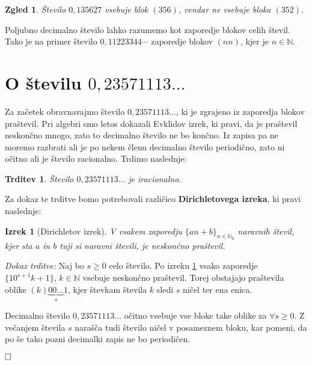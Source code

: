 \documentclass[a4paper,12pt]{article}
\def\N{\mathbb{N}} %
\def\qed{$\hfill\Box$}   %
\newtheorem{izrek}{Izrek}
\newtheorem{trditev}{Trditev}
\newtheorem{zgled}{Zgled}
\begin{document}
\begin{zgled}
    Število $0,135627$ vsebuje blok $(356)$, vendar ne vsebuje bloka $(352)$.
\end{zgled}

Poljubno decimalno število lahko razumemo kot zaporedje blokov celih števil.
Tako je na primer število $0,11223344 \cdots$ zaporedje blokov $(nn)$,
kjer je $n \in \N$.


\section{O številu $0,23571113 \dots$}

Za začetek obravnavajmo število $0,23571113 \dots$, ki je zgrajeno iz zaporedja
blokov praštevil. 
Pri algebri smo letos dokazali Evklidov izrek, ki pravi, da je praštevil neskončno mnogo,
zato to decimalno število ne bo končno. 
Iz zapisa pa ne moremo razbrati ali 
je po nekem členu decimalno število periodično, zato ni očitno ali je število racionalno.
Trdimo naslednje:

\begin{trditev}
    \label{trditev praštevila}
    Število $0,23571113 \dots$ je iracionalno.
\end{trditev}

Za dokaz te trditve bomo potrebovali različico \textbf{Dirichletovega izreka}, ki pravi naslednje:

\begin{izrek}[Dirichletov izrek]
    \label{Dirichletov izrek}
    V vsakem zaporedju $ \lbrace an + b \rbrace_{n \in \N_0}$ naravnih števil, kjer sta $a$ in $b$
    tuji si naravni števili, je neskončno praštevil.
\end{izrek}

\noindent
{\em Dokaz trditve:\/} Naj bo $s \geq 0$ celo število. Po izreku \ref{Dirichletov izrek} vsako zaporedje
$ \{10^{s+1}k + 1\}$, $k \in \N$ vsebuje neskončno praštevil. Torej obstajajo praštevila
oblike $(k)\underbrace{00 \dots}_{s}1$, kjer števkam števila $k$ sledi $s$ ničel ter ena enica. 

Decimalno število $0,23571113\dots$ očitno vsebuje vse bloke take oblike za $\forall s \geq 0$. Z večanjem števila
$s$ narašča tudi število ničel v posameznem bloku, kar pomeni, da po še tako pozni decimalki zapis ne bo periodičen.

\qed
\end{document}
